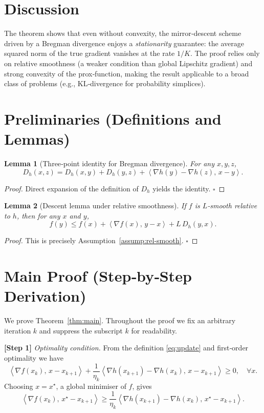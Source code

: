 \documentclass{article}
\newtheorem{lemma}{Lemma}
\newcommand{\inner}[2]{\left\langle #1,\,#2 \right\rangle}
\newcommand{\D}[2]{D_{h}(#1,#2)}
\newcommand{\grad}{\nabla}
\begin{document}
\section*{Discussion}
The theorem shows that even without convexity, the mirror‑descent scheme driven by a Bregman divergence enjoys a \emph{stationarity} guarantee: the average squared norm of the true gradient vanishes at the rate $1/K$. The proof relies only on relative smoothness (a weaker condition than global Lipschitz gradient) and strong convexity of the prox‑function, making the result applicable to a broad class of problems (e.g., KL‑divergence for probability simplices).

\newpage

\section*{Preliminaries (Definitions and Lemmas)}
\begin{lemma}[Three‑point identity for Bregman divergence]
\label{lem:3pt}
For any $x,y,z$,
\[
\D{x}{z} = \D{x}{y} + \D{y}{z} + \inner{\grad h(y)-\grad h(z)}{x-y}.
\]
\end{lemma}
\begin{proof}
Direct expansion of the definition of $D_h$ yields the identity. \hfill $\square$
\end{proof}

\begin{lemma}[Descent lemma under relative smoothness]
\label{lem:rel-descent}
If $f$ is $L$‑smooth relative to $h$, then for any $x$ and $y$,
\[
f(y)\le f(x)+\inner{\grad f(x)}{y-x}+L\,\D{y}{x}.
\]
\end{lemma}
\begin{proof}
This is precisely Assumption~\ref{assump:rel-smooth}. \hfill $\square$
\end{proof}

\section*{Main Proof (Step‑by‑Step Derivation)}
We prove Theorem~\ref{thm:main}. Throughout the proof we fix an arbitrary iteration $k$ and suppress the subscript $k$ for readability.

\bigskip
\noindent\textbf{[Step 1]} \emph{Optimality condition.}  
From the definition \eqref{eq:update} and first‑order optimality we have
\[
\inner{\grad f(x_k)}{x-x_{k+1}}+\frac{1}{\eta_k}\inner{\grad h(x_{k+1})-\grad h(x_k)}{x-x_{k+1}}\ge 0,
\quad\forall x.
\]
Choosing $x=x^\star$, a global minimiser of $f$, gives
\begin{equation}
\label{eq:opt-star}
\inner{\grad f(x_k)}{x^\star-x_{k+1}} \ge
\frac{1}{\eta_k}\inner{\grad h(x_{k+1})-\grad h(x_k)}{x^\star-x_{k+1}} .
\end{equation}
\end{document}
